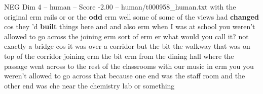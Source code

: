 \begin{textsample}{NEG Dim 4 – human – Score -2.00 – human/t000958\_human.txt}  \label{ex:f4_neg_038}
with the original erm rails or or the \textbf{odd} erm well some of some of the views had \textbf{changed} cos they 'd \textbf{built} things here and and also erm when I was at school you weren't allowed to go across the joining erm sort of erm er what would you call it? not exactly a bridge cos it was over a corridor but the bit the walkway that was on top of the corridor joining erm the bit erm from the dining hall where the passage went across to the rest of the classrooms with our music in erm you you weren't allowed to go across that because one end was the staff room and the other end was che near the chemistry lab or something

\end{textsample}
